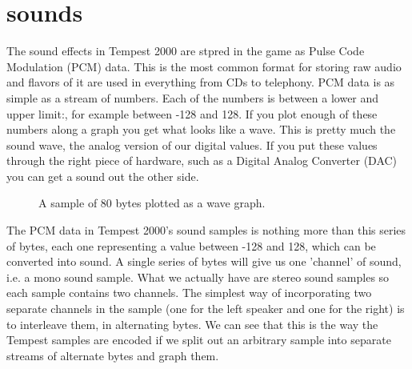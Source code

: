 \chapter{sounds}
\label{sec:listing}
\lstset{style=68KStyle}

The sound effects in Tempest 2000 are stpred in the game as Pulse Code Modulation (PCM) data. This is the most common format for storing
raw audio and flavors of it are used in everything from CDs to telephony. PCM data is as simple as a stream of numbers. Each of the numbers
is between a lower and upper limit:, for example between -128 and 128. If you plot enough of these numbers along a graph you get what looks like
a wave. This is pretty much the sound wave, the analog version of our digital values. If you put these values through the right piece of hardware,
such as a Digital Analog Converter (DAC) you can get a sound out the other side.

\begin{figure}[H]
    \centering
    \begin{adjustbox}{width=7cm,center}
    \end{adjustbox}
  \caption{A sample of 80 bytes plotted as a wave graph.}
\end{figure}

The PCM data in Tempest 2000's sound samples is nothing more than this series of bytes, each one representing a value between -128 and 128, which can
be converted into sound. A single series of bytes will give us one 'channel' of sound, i.e. a mono sound sample. What we actually have are stereo
sound samples so each sample contains two channels. The simplest way of incorporating two separate channels in the sample (one for the left speaker
and one for the right) is to interleave them, in alternating bytes. We can see that this is the way the Tempest samples are encoded if we split out
an arbitrary sample into separate streams of alternate bytes and graph them.

